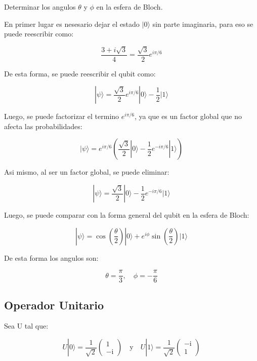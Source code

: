 \documentclass[11pt]{article}
\newcommand{\ii}{\mathrm{i}}
\begin{document}
Determinar los angulos $\theta$ y $\phi$ en la esfera de Bloch.

En primer lugar es nesesario dejar el estado $|0\rangle$ sin parte imaginaria, para eso se puede reescribir como:

\begin{equation}
    \frac{3 + i\sqrt{3}}{4} = \frac{\sqrt{3}}{2} e^{i\pi/6}
\end{equation}

De esta forma, se puede reescribir el qubit como:

\begin{equation}
    |\psi\rangle = \frac{\sqrt{3}}{2} e^{i\pi/6} |0\rangle - \frac{1}{2} |1\rangle
\end{equation}

Luego, se puede factorizar el termino $e^{i\pi/6}$, ya que es un factor global que no afecta las probabilidades:

\begin{equation}
    |\psi\rangle = e^{i\pi/6} \left( \frac{\sqrt{3}}{2} |0\rangle - \frac{1}{2} e^{-i\pi/6} |1\rangle \right)
\end{equation}

Asi mismo, al ser un factor global, se puede eliminar:

\begin{equation}
    |\psi\rangle = \frac{\sqrt{3}}{2} |0\rangle - \frac{1}{2} e^{-i\pi/6} |1\rangle
\end{equation}

Luego, se puede comparar con la forma general del qubit en la esfera de Bloch:

\begin{equation}
    |\psi\rangle = \cos\left(\frac{\theta}{2}\right) |0\rangle + e^{i\phi} \sin\left(\frac{\theta}{2}\right) |1\rangle
\end{equation}

De esta forma los angulos son:

\begin{equation}
    \theta = \frac{\pi}{3}, \quad \phi = -\frac{\pi}{6}
\end{equation}

\subsection{Operador Unitario}

Sea U tal que:

\begin{equation}
    U |0\rangle = \frac{1}{\sqrt{2}} \begin{pmatrix} 1 \\ -\ii \end{pmatrix} \quad \text{y} \quad U |1\rangle = \frac{1}{\sqrt{2}} \begin{pmatrix} -\ii \\ 1 \end{pmatrix}
\end{equation}
\end{document}
